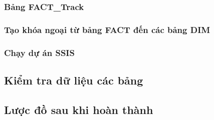 \subsubsection{Bảng FACT\_Track}

\subsubsection{Tạo khóa ngoại từ bảng FACT đến các bảng DIM}

\subsubsection{Chạy dự án SSIS}

\subsection{Kiểm tra dữ liệu các bảng}

\subsection{Lược đồ sau khi hoàn thành}
